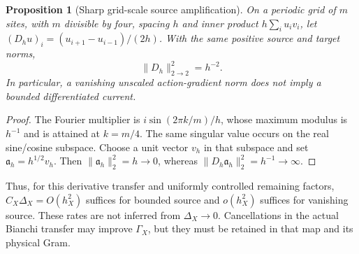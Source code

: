 \documentclass[11pt]{article}
\newtheorem{proposition}[proposition]{Proposition}
\theoremstyle{definition}
\theoremstyle{remark}
\begin{document}
\begin{proposition}[Sharp grid-scale source amplification]
\label{prop:supp-current-derivative-loss}
On a periodic grid of $m$ sites, with $m$ divisible by four, spacing $h$ and
inner product $h\sum_i u_iv_i$, let
$(D_hu)_i=(u_{i+1}-u_{i-1})/(2h)$.  With the same positive source and target
norms,
\begin{equation}
 \|D_h\|_{2\to2}^2=h^{-2}.
 \label{eq:supp-current-derivative-loss}
\end{equation}
In particular, a vanishing unscaled action-gradient norm does not imply a
bounded differentiated current.
\end{proposition}
\begin{proof}
The Fourier multiplier is $i\sin(2\pi k/m)/h$, whose maximum modulus is
$h^{-1}$ and is attained at $k=m/4$.  The same singular value occurs on the
real sine/cosine subspace.  Choose a unit vector $v_h$ in that subspace and
set $\mathfrak a_h=h^{1/2}v_h$.  Then
$\|\mathfrak a_h\|_2^2=h\to0$, whereas
$\|D_h\mathfrak a_h\|_2^2=h^{-1}\to\infty$.
\end{proof}

Thus, for this derivative transfer and uniformly controlled remaining
factors, $C_X\Delta_X=O(h_X^2)$ suffices for bounded source and
$o(h_X^2)$ suffices for vanishing source.  These rates are not inferred from
$\Delta_X\to0$.  Cancellations in the actual Bianchi transfer may improve
$\Gamma_X$, but they must be retained in that map and its physical Gram.
\end{document}
